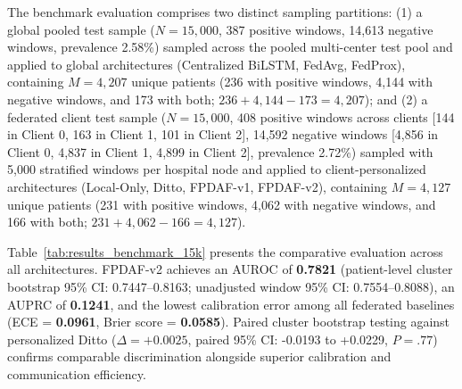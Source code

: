 \documentclass[journal,twocolumn,10pt]{IEEEtran}
\begin{document}
The benchmark evaluation comprises two distinct sampling partitions: (1) a global pooled test sample ($N=15,000$, 387 positive windows, 14,613 negative windows, prevalence 2.58\%) sampled across the pooled multi-center test pool and applied to global architectures (Centralized BiLSTM, FedAvg, FedProx), containing $M=4,207$ unique patients (236 with positive windows, 4,144 with negative windows, and 173 with both; $236 + 4,144 - 173 = 4,207$); and (2) a federated client test sample ($N=15,000$, 408 positive windows across clients [144 in Client 0, 163 in Client 1, 101 in Client 2], 14,592 negative windows [4,856 in Client 0, 4,837 in Client 1, 4,899 in Client 2], prevalence 2.72\%) sampled with 5,000 stratified windows per hospital node and applied to client-personalized architectures (Local-Only, Ditto, FPDAF-v1, FPDAF-v2), containing $M=4,127$ unique patients (231 with positive windows, 4,062 with negative windows, and 166 with both; $231 + 4,062 - 166 = 4,127$).

Table~\ref{tab:results_benchmark_15k} presents the comparative evaluation across all architectures. FPDAF-v2 achieves an AUROC of \textbf{0.7821} (patient-level cluster bootstrap 95\% CI: 0.7447--0.8163; unadjusted window 95\% CI: 0.7554--0.8088), an AUPRC of \textbf{0.1241}, and the lowest calibration error among all federated baselines (ECE = \textbf{0.0961}, Brier score = \textbf{0.0585}). Paired cluster bootstrap testing against personalized Ditto ($\Delta = +0.0025$, paired 95\% CI: -0.0193 to +0.0229, $P = .77$) confirms comparable discrimination alongside superior calibration and communication efficiency.
\end{document}
